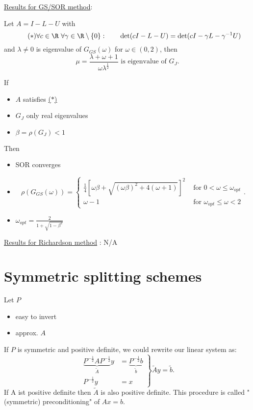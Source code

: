\begin{mdframed}
	\underline{Results for GS/SOR method}:

	\begin{thm}
		Let $A = I - L - U$ with
		\begin{equation}\label{eq:gsstar}\tag{$\ast$}
			\forall c \in \R ~ \forall\gamma  \in \R \setminus \left\{ 0 \right\}: \qquad \det(cI-L-U) = \det(cI-\gamma L - \gamma ^{-1}U) 
		\end{equation}
		and $\lambda \neq 0$ is eigenvalue of $G_{GS}(\omega )$ for $\omega \in(0,2)$, then
		\[
		\mu  = \frac{\lambda +\omega +1}{\omega \lambda ^{\frac{1}{2}}} \text{ is eigenvalue of }G_{J}
		.\] 
	\end{thm}
	\begin{thm}
		If
		\begin{itemize}
			\item $A$ satisfies \href{eq:gsstar}{($\ast$)} 
			\item $G_{J}$ only real eigenvalues
			\item $\beta = \rho (G_{J}) < 1$
		\end{itemize}
		Then
		\begin{itemize}
			\item SOR converges
			\item \[
					\rho (G_{GS}(\omega )) = \begin{cases}
						\frac{1}{4} \left[ \omega \beta + \sqrt{(\omega \beta )^2 + 4(\omega +1)}  \right]^2 & \text{ for }0 < \omega \leq \omega _{opt} \\
						\omega -1 & \text{ for } \omega _{opt} \leq  \omega < 2
					\end{cases}
			.\] 
		\item $\omega _{opt} = \frac{2}{1 +\sqrt{1-\beta ^2} }$
		\end{itemize}
	\end{thm}

	\underline{Results for Richardson method} : N/A
\end{mdframed}

\section{Symmetric splitting schemes}
\label{sec:Symmetric splitting schemes}

Let $P$
\begin{itemize}
	\item easy to invert
	\item approx. $A$
\end{itemize}
If $P$ is symmetric and positive definite, we could rewrite our linear system as:
\[
	\left.
	\begin{array}{rl}
	\underbrace{P^{-\frac{1}{2}}A P^{-\frac{1}{2}}}_{\tilde{A}} y &= \underbrace{ P^{-\frac{1}{2}}b}_{\tilde{b}} \\
	P^{-\frac{1}{2}}y &= x
	\end{array}
	\right\}
	\tilde{A} y = \tilde{b}
.\] 
If A ist positive definite then $\tilde{A}$ is also positive definite. This procedure is called "(symmetric) preconditioning" of $Ax = b$.


